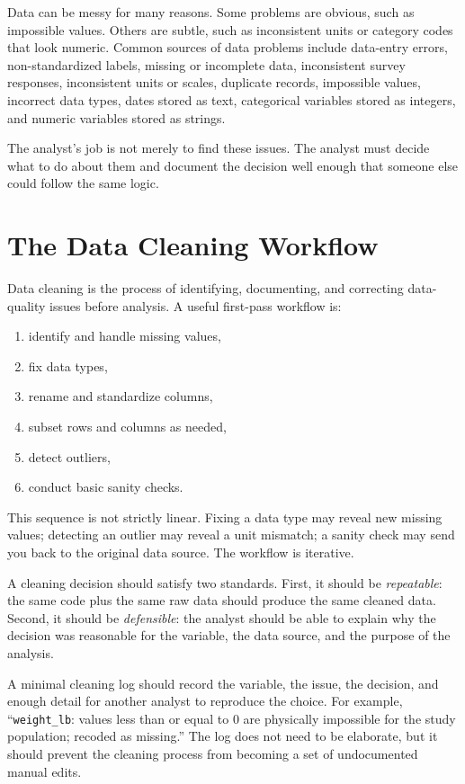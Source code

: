 {Data can be messy for many reasons.  Some problems are obvious, such as impossible values.  Others are subtle, such as inconsistent units or category codes that look numeric.  Common sources of data problems include data-entry errors, non-standardized labels, missing or incomplete data, inconsistent survey responses, inconsistent units or scales, duplicate records, impossible values, incorrect data types, dates stored as text, categorical variables stored as integers, and numeric variables stored as strings.

The analyst's job is not merely to find these issues.  The analyst must decide what to do about them and document the decision well enough that someone else could follow the same logic.

\section{The Data Cleaning Workflow}

Data cleaning is the process of identifying, documenting, and correcting data-quality issues before analysis.  A useful first-pass workflow is:
\begin{enumerate}
  \item identify and handle missing values,
  \item fix data types,
  \item rename and standardize columns,
  \item subset rows and columns as needed,
  \item detect outliers,
  \item conduct basic sanity checks.
\end{enumerate}

This sequence is not strictly linear.  Fixing a data type may reveal new missing values; detecting an outlier may reveal a unit mismatch; a sanity check may send you back to the original data source.  The workflow is iterative.

A cleaning decision should satisfy two standards.  First, it should be \emph{repeatable}: the same code plus the same raw data should produce the same cleaned data.  Second, it should be \emph{defensible}: the analyst should be able to explain why the decision was reasonable for the variable, the data source, and the purpose of the analysis.

A minimal cleaning log should record the variable, the issue, the decision, and enough detail for another analyst to reproduce the choice.  For example, ``\texttt{weight\_lb}: values less than or equal to 0 are physically impossible for the study population; recoded as missing.''  The log does not need to be elaborate, but it should prevent the cleaning process from becoming a set of undocumented manual edits.

}
